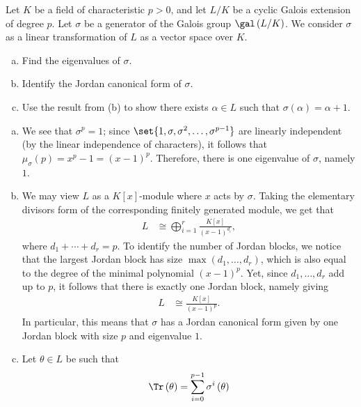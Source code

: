 \documentclass[10pt]{mypackage}
\begin{document}
\begin{problem}[Problem 8]
  Let $K$ be a field of characteristic $p > 0$, and let $L/K$ be a cyclic Galois extension of degree $p$. Let $\sigma$ be a generator of the Galois group $\gal\left( L/K \right)$. We consider $\sigma$ as a linear transformation of $L$ as a vector space over $K$.
  \begin{enumerate}[(a)]
    \item Find the eigenvalues of $\sigma$.
    \item Identify the Jordan canonical form of $\sigma$.
    \item Use the result from (b) to show there exists $\alpha\in L$ such that $\sigma\left( \alpha \right) = \alpha + 1$.
  \end{enumerate}
\end{problem}
\begin{solution}\hfill
  \begin{enumerate}[(a)]
    \item We see that $\sigma^{p} = 1$; since $\set{1,\sigma,\sigma^2,\dots,\sigma^{p-1}}$ are linearly independent (by the linear independence of characters), it follows that $\mu_{\sigma}(p) = x^{p}-1 = \left( x-1 \right)^{p}$. Therefore, there is one eigenvalue of $\sigma$, namely $1$.
    \item We may view $L$ as a $K[x]$-module where $x$ acts by $\sigma$. Taking the elementary divisors form of the corresponding finitely generated module, we get that
      \begin{align*}
        L &\cong \bigoplus_{i=1}^{r} \frac{K[x]}{\left( x-1 \right)^{d_i}},
      \end{align*}
      where $d_1 + \cdots + d_r = p$. To identify the number of Jordan blocks, we notice that the largest Jordan block has size $\max\left( d_1,\dots,d_r \right)$, which is also equal to the degree of the minimal polynomial $\left( x-1 \right)^{p}$. Yet, since $d_1,\dots,d_r$ add up to $p$, it follows that there is exactly one Jordan block, namely giving
      \begin{align*}
        L &\cong \frac{K[x]}{\left( x-1 \right)^{p}}.
      \end{align*}
      In particular, this means that $\sigma$ has a Jordan canonical form given by one Jordan block with size $p$ and eigenvalue $1$.
    \item Let $\theta\in L$ be such that
      \begin{align*}
        \Tr\left( \theta \right) &= \sum_{i=0}^{p-1} \sigma^{i}\left( \theta \right)\\

\end{align*}
\end{enumerate}
\end{solution}
\end{document}
